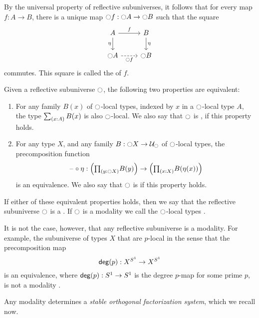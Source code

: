 \documentclass[9pt,twosided]{amsart}
\begin{document}
By the universal property of reflective subuniverses, it follows that for every map $f:A\to B$, there is a unique map ${\ocircle} f : {\ocircle} A \to {\ensuremath{\ocircle}} B$ such that the square
\begin{equation*}
  \begin{tikzcd}
    A \arrow[d,swap,"\eta"] \arrow[r,"f"] & B \arrow[d,"\eta"] \\
    \modal A \arrow[r,dashed,swap,"\modal f"] & \modal B
  \end{tikzcd}
\end{equation*}
commutes. This square is called the  of $f$.

\begin{prp}\label{prp:modality}
  Given a reflective subuniverse ${\ocircle}$, the following two properties are equivalent:
  \begin{enumerate}
  \item For any family $B(x)$ of ${\ocircle}$-local types, indexed by $x$ in a ${\ocircle}$-local type $A$, the type $\sm{x:A}B(x)$ is also ${\ocircle}$-local. We also say that ${\ocircle}$ is , if this property holds.
  \item For any type $X$, and any family $B:{\ocircle} X\to\mathcal{U}_{\ocircle}$ of ${\ocircle}$-local types, the precomposition function
    \begin{equation*}
      \blank\circ\eta : \Big(\prd{y:\modal X}B(y)\Big)\to\Big(\prd{x:X}B(\eta(x))\Big)
    \end{equation*}
    is an equivalence. We also say that ${\ocircle}$ is  if this property holds.
  \end{enumerate}
  If either of these equivalent properties holds, then we say that the reflective subuniverse ${\ocircle}$ is a . If ${\ocircle}$ is a modality we call the ${\ocircle}$-local types .
\end{prp}

It is not the case, however, that any reflective subuniverse is a modality. For example, the subuniverse of types $X$ that are $p$-local in the sense that the precomposition map
\begin{equation*}
  \mathsf{deg}(p) : X^{S^{1}}\to X^{S^{1}}
\end{equation*}
is an equivalence, where $\mathsf{deg}(p):S^{1}\to S^{1}$ is the degree $p$-map for some prime $p$, is not a modality \cite{CORS}.

Any modality determines a \emph{stable orthogonal factorization system}, which we recall now.
\end{document}
